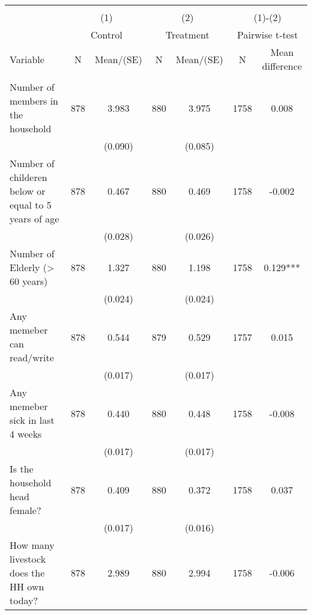 
\begin{tabular}{@{\extracolsep{5pt}}lcccccc}
\\[-1.8ex]\hline \hline \\[-1.8ex]
 & \multicolumn{2}{c}{(1)}  & \multicolumn{2}{c}{(2)}  & \multicolumn{2}{c}{(1)-(2)} \\
 & \multicolumn{2}{c}{Control}  & \multicolumn{2}{c}{Treatment}  & \multicolumn{2}{c}{Pairwise t-test}  \\
Variable & N & Mean/(SE) & N & Mean/(SE) & N & Mean difference \\ \hline \\[-1.8ex] 
Number of members in the household   & 878    & 3.983    & 880    & 3.975    & 1758    & 0.008   \\
 &   & (0.090)  &   & (0.085)  &   &  \\ [1ex]
Number of childeren below or equal to 5 years of age   & 878    & 0.467    & 880    & 0.469    & 1758    & -0.002   \\
 &   & (0.028)  &   & (0.026)  &   &  \\ [1ex]
Number of Elderly (> 60 years)   & 878    & 1.327    & 880    & 1.198    & 1758    & 0.129***   \\
 &   & (0.024)  &   & (0.024)  &   &  \\ [1ex]
Any memeber can read/write   & 878    & 0.544    & 879    & 0.529    & 1757    & 0.015   \\
 &   & (0.017)  &   & (0.017)  &   &  \\ [1ex]
Any memeber sick in last 4 weeks   & 878    & 0.440    & 880    & 0.448    & 1758    & -0.008   \\
 &   & (0.017)  &   & (0.017)  &   &  \\ [1ex]
Is the household head female?   & 878    & 0.409    & 880    & 0.372    & 1758    & 0.037   \\
 &   & (0.017)  &   & (0.016)  &   &  \\ [1ex]
How many livestock does the HH own today?   & 878    & 2.989    & 880    & 2.994    & 1758    & -0.006   \\

\end{tabular}
